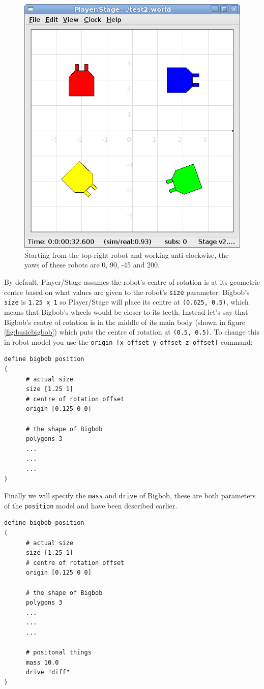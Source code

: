 \documentclass[a4paper]{report}
\newcommand{\plst}{Player/Stage\xspace}
\begin{document}
\begin{figure}
	\centering
	\includegraphics[width=0.6\linewidth]{./pics/robot_building/yaw_examples.png} 
	\caption{Starting from the top right robot and working anti-clockwise, the yaws of these robots are 0, 90, -45 and 200.}
	\label{fig:yaws}
\end{figure}

By default, \plst assumes the robot's centre of rotation is at its geometric centre based on what values are given to the robot's \verb|size| parameter. Bigbob's \verb|size| is \verb|1.25 x 1| so \plst will place its centre at \verb|(0.625, 0.5)|, which means that Bigbob's wheels would be closer to its teeth. Instead let's say that Bigbob's centre of rotation is in the middle of its main body (shown in figure \ref{fig:basicbigbob}) which puts the centre of rotation at \verb|(0.5, 0.5)|. To change this in robot model you use the \verb|origin [x-offset y-offset z-offset]| command:
\begin{verbatim}
define bigbob position
(
      # actual size
      size [1.25 1]
      # centre of rotation offset
      origin [0.125 0 0]

      # the shape of Bigbob
      polygons 3
      ...
      ...
      ...
)
\end{verbatim}

Finally we will specify the \verb|mass| and \verb|drive| of Bigbob, these are both parameters of the \verb|position| model and have been described earlier.
\begin{verbatim}
define bigbob position
(
      # actual size
      size [1.25 1]
      # centre of rotation offset
      origin [0.125 0 0]

      # the shape of Bigbob
      polygons 3
      ...
      ...
      ...
      
      # positonal things
      mass 10.0
      drive "diff"
)
\end{verbatim}
\end{document}
